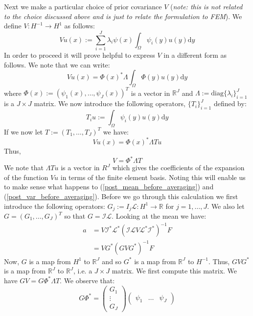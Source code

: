 \documentclass{article}
\theoremstyle{definition}
\theoremstyle{remark}
\begin{document}
Next we make a particular choice of prior covariance $V$ (\textit{note: this is not related to the choice discussed above and is just to relate the formulation to FEM}). We define $V:H^{-1}\rightarrow H^1$ as follows:
\begin{equation}
    \label{FEM_prior}
    Vu(x) := \sum_{i=1}^{J}\lambda_{i}\psi(x)\int_{\Omega}\psi_{i}(y)u(y)\mathrm{d}y
\end{equation}
In order to proceed it will prove helpful to express $V$ in a different form as follows. We note that we can write:
\begin{equation*}
    Vu(x)=\Phi(x)^{*}\Lambda\int_{\Omega}\Phi(y)u(y)\mathrm{d}y
\end{equation*}
where $\Phi(x):=(\psi_{1}(x),\dots,\psi_{J}(x))^{T}$ is a vector in $\mathbb{R}^{J}$ and $\Lambda:=\text{diag}\{\lambda_{i}\}_{i=1}^{J}$ is a $J\times J$ matrix. We now introduce the following operators, $\{T_i\}_{i=1}^{J}$ defined by:
\begin{equation*}
    T_{i}u:=\int_{\Omega}\psi_{i}(y)u(y)\mathrm{d}y
\end{equation*}
If we now let $T:=(T_1,\dots,T_{J})^{T}$ we have:
\begin{equation*}
    Vu(x)=\Phi(x)^{*}\Lambda Tu
\end{equation*}
Thus,
\begin{equation*}
    V=\Phi^{*}\Lambda T
\end{equation*}
We note that $\Lambda Tu$ is a vector in $R^{J}$ which gives the coefficients of the expansion of the function $Vu$ in terms of the finite element basis. Noting this will enable us to make sense what happens to (\ref{post_mean_before_averaging}) and (\ref{post_var_before_averaging}). Before we go through this calculation we first introduce the following operators: $G_j:=I_{j}\mathcal{L}:H^{1}\rightarrow\mathbb{R}$ for $j=1,\dots,J$. We also let $G=(G_1,\dots,G_J)^{T}$ so that $G=\mathcal{I}\mathcal{L}$. Looking at the mean we have:
\begin{align*}
    a &= V\mathcal{I}^{*}\mathcal{L}^{*}(\mathcal{I}\mathcal{L}V\mathcal{L}^{*}\mathcal{I}^{*})^{-1}F \\
    &= VG^{*}(GVG^{*})^{-1}F
\end{align*}
Now, $G$ is a map from $H^{1}$ to $\mathbb{R}^{J}$ and so $G^{*}$ is a map from $\mathbb{R}^{J}$ to $H^{-1}$. Thus, $GVG^{*}$ is a map from $\mathbb{R}^{J}$ to $\mathbb{R}^{J}$, i.e. a $J\times J$ matrix. We first compute this matrix. We have $GV=G\Phi^{*}\Lambda T$. We observe that:
\begin{equation*}
    G\Phi^{*}=\begin{pmatrix}
                G_1 \\
                \vdots \\
                G_{J}
              \end{pmatrix} \begin{pmatrix}
                                \psi_1 & \hdots & \psi_{J}
                            \end{pmatrix}
\end{equation*}
\end{document}
